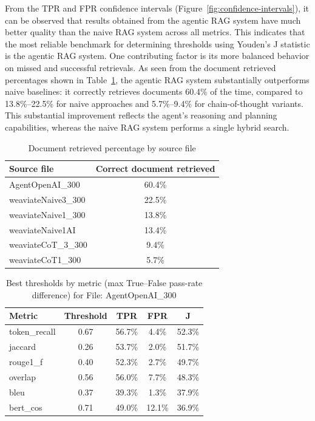 From the TPR and FPR confidence intervals (Figure~\ref{fig:confidence-intervals}), it can be observed that results obtained from the agentic RAG system have much better quality than the naive RAG system across all metrics. This indicates that the most reliable benchmark for determining thresholds using Youden's J statistic is the agentic RAG system. One contributing factor is its more balanced behavior on missed and successful retrievals. As seen from the document retrieved percentages shown in Table~\ref{tab:doc-retrieved-by-source}, the agentic RAG system substantially outperforms naive baselines: it correctly retrieves documents 60.4\% of the time, compared to 13.8\%–22.5\% for naive approaches and 5.7\%–9.4\% for chain-of-thought variants. This substantial improvement reflects the agent's reasoning and planning capabilities, whereas the naive RAG system performs a single hybrid search.

\begin{table}[htbp]
    \centering
    \begin{tabular}{l c}
        \hline
        Source file & Correct document retrieved \\
        \hline
    AgentOpenAI\_300 & 60.4\% \\
    weaviateNaive3\_300 & 22.5\% \\
    weaviateNaive1\_300 & 13.8\% \\
    weaviateNaive1AI & 13.4\% \\
    weaviateCoT\_3\_300 & 9.4\% \\
    weaviateCoT1\_300 & 5.7\% \\
        \hline
    \end{tabular}
    \caption{Document retrieved percentage by source file}\label{tab:doc-retrieved-by-source}
\end{table}

\begin{table}[htbp]
  \centering
  \begin{tabular}{l c c c c}
    \hline
    Metric & Threshold & TPR & FPR & J \\
    \hline
    token\_recall & 0.67 & 56.7\% & 4.4\%  & 52.3\% \\
    jaccard       & 0.26 & 53.7\% & 2.0\%  & 51.7\% \\
    rouge1\_f     & 0.40 & 52.3\% & 2.7\%  & 49.7\% \\
    overlap       & 0.56 & 56.0\% & 7.7\%  & 48.3\% \\
    bleu          & 0.37 & 39.3\% & 1.3\%  & 37.9\% \\
    bert\_cos     & 0.71 & 49.0\% & 12.1\% & 36.9\% \\
    \hline
  \end{tabular}
    \caption{Best thresholds by metric (max True--False pass-rate difference) for File: AgentOpenAI\_300}\label{tab:agentopenai300-best-thresholds}
\end{table}


